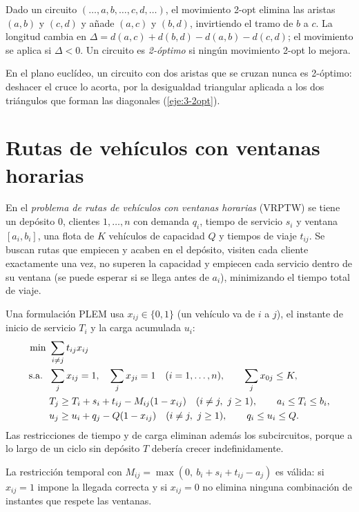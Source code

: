 \begin{definicion}\label{def:2opt}
Dado un circuito $(\dots,a,b,\dots,c,d,\dots)$, el movimiento 2-opt elimina las aristas $(a,b)$ y $(c,d)$ y añade $(a,c)$ y $(b,d)$, invirtiendo el tramo de $b$ a $c$. La longitud cambia en $\Delta=d(a,c)+d(b,d)-d(a,b)-d(c,d)$; el movimiento se aplica si $\Delta<0$. Un circuito es \emph{2-óptimo} si ningún movimiento 2-opt lo mejora.
\end{definicion}

En el plano euclídeo, un circuito con dos aristas que se cruzan nunca es 2-óptimo: deshacer el cruce lo acorta, por la desigualdad triangular aplicada a los dos triángulos que forman las diagonales (\cref{eje:3-2opt}).

\section{Rutas de vehículos con ventanas horarias}

\begin{definicion}[VRPTW]\label{def:vrptw}
En el \emph{problema de rutas de vehículos con ventanas horarias} (VRPTW) se tiene un depósito $0$, clientes $1,\dots,n$ con demanda $q_i$, tiempo de servicio $s_i$ y ventana $[a_i,b_i]$, una flota de $K$ vehículos de capacidad $Q$ y tiempos de viaje $t_{ij}$. Se buscan rutas que empiecen y acaben en el depósito, visiten cada cliente exactamente una vez, no superen la capacidad y empiecen cada servicio dentro de su ventana (se puede esperar si se llega antes de $a_i$), minimizando el tiempo total de viaje.
\end{definicion}

Una formulación PLEM usa $x_{ij}\in\{0,1\}$ (un vehículo va de $i$ a $j$), el instante de inicio de servicio $T_i$ y la carga acumulada $u_i$:
\begin{align*}
\min\ &\sum_{i\ne j}t_{ij}x_{ij}\\
\text{s.a.}\ \ &\sum_{j}x_{ij}=1,\quad \sum_{j}x_{ji}=1\quad(i=1,\dots,n),\qquad \sum_j x_{0j}\le K,\\
&T_j\ge T_i+s_i+t_{ij}-M_{ij}(1-x_{ij})\quad(i\ne j,\ j\ge 1),\qquad a_i\le T_i\le b_i,\\
&u_j\ge u_i+q_j-Q(1-x_{ij})\quad(i\ne j,\ j\ge 1),\qquad q_i\le u_i\le Q .
\end{align*}
Las restricciones de tiempo y de carga eliminan además los subcircuitos, porque a lo largo de un ciclo sin depósito $T$ debería crecer indefinidamente.

\begin{proposicion}\label{prop:bigm-tw}
La restricción temporal con $M_{ij}=\max(0,\ b_i+s_i+t_{ij}-a_j)$ es válida: si $x_{ij}=1$ impone la llegada correcta y si $x_{ij}=0$ no elimina ninguna combinación de instantes que respete las ventanas.
\end{proposicion}

